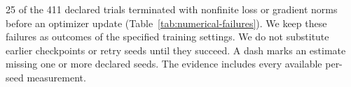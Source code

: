 25 of the 411 declared trials terminated with nonfinite loss or gradient norms before an optimizer update (Table~\ref{tab:numerical-failures}). We keep these failures as outcomes of the specified training settings. We do not substitute earlier checkpoints or retry seeds until they succeed. A dash marks an estimate missing one or more declared seeds. The evidence includes every available per-seed measurement.

